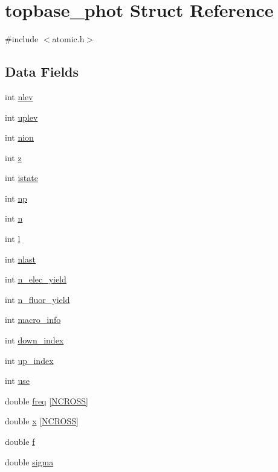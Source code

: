 \hypertarget{structtopbase__phot}{}\section{topbase\+\_\+phot Struct Reference}
\label{structtopbase__phot}


{\ttfamily \#include $<$atomic.\+h$>$}

\subsection*{Data Fields}
\begin{DoxyCompactItemize}
\item 
int \hyperlink{structtopbase__phot_ae51ac7fd7f3c120cf7eb188b207b824f}{nlev}
\item 
int \hyperlink{structtopbase__phot_aa07be8946fb5a7bb165ee7f3e90aeb7c}{uplev}
\item 
int \hyperlink{structtopbase__phot_a9d54441dd7c9a93f9a937975b77c04cc}{nion}
\item 
int \hyperlink{structtopbase__phot_a2c145af1ccb60672e5c8c2925961ea2f}{z}
\item 
int \hyperlink{structtopbase__phot_a6fcc6201c5227485532cd3283bc596c5}{istate}
\item 
int \hyperlink{structtopbase__phot_a6be4533b59ab67c16fa1f5d3a31869e8}{np}
\item 
int \hyperlink{structtopbase__phot_a90291444d813ae17dc857a699e4b11df}{n}
\item 
int \hyperlink{structtopbase__phot_a1decc23405c8dc2f0b6e29a9c98a70e3}{l}
\item 
int \hyperlink{structtopbase__phot_a337e4f47bd00554925de1187d5bba74d}{nlast}
\item 
int \hyperlink{structtopbase__phot_a7fbc346de57038e8edb8144631a47b28}{n\+\_\+elec\+\_\+yield}
\item 
int \hyperlink{structtopbase__phot_a05b20143abfd928b47a06ec7c84ad6ce}{n\+\_\+fluor\+\_\+yield}
\item 
int \hyperlink{structtopbase__phot_a0552ae390dbc87aa64fdd05d32227006}{macro\+\_\+info}
\item 
int \hyperlink{structtopbase__phot_ae229323c0d16d0a56d3cbedd5700190f}{down\+\_\+index}
\item 
int \hyperlink{structtopbase__phot_a03ee0f1b94d68ffefae466494aa91a83}{up\+\_\+index}
\item 
int \hyperlink{structtopbase__phot_a01a398b80c1488717ec6461de77dbd7d}{use}
\item 
double \hyperlink{structtopbase__phot_a18d8d6eeb8df6e8ad2f89550c6b86310}{freq} \mbox{[}\hyperlink{atomic_8h_a9012fd4c06f8e07e4288a6c441c44b63}{N\+C\+R\+O\+SS}\mbox{]}
\item 
double \hyperlink{structtopbase__phot_aa15794821f59dce49173ad06ae48c1df}{x} \mbox{[}\hyperlink{atomic_8h_a9012fd4c06f8e07e4288a6c441c44b63}{N\+C\+R\+O\+SS}\mbox{]}
\item 
double \hyperlink{structtopbase__phot_acb68a1799ed2de5740faab1907342c6c}{f}
\item 
double \hyperlink{structtopbase__phot_a82bf586bf86985df9b899c0141790bd4}{sigma}
\end{DoxyCompactItemize}


